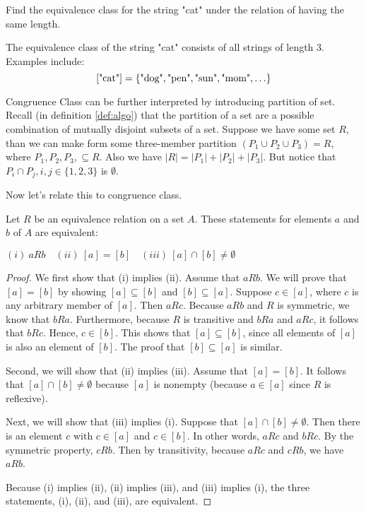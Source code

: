 \begin{example}
	Find the equivalence class for the string "cat" under the relation of having the same length.
\end{example}

\begin{solution}
	The equivalence class of the string "cat" consists of all strings of length 3. Examples include:
	\[ [\text{"cat"}] = \{ \text{"dog"}, \text{"pen"}, \text{"sun"}, \text{"mom"}, \ldots \} \]
\end{solution}
Congruence Class can be further interpreted by introducing partition of set. Recall (in definition \ref{def:algo}) that the partition of a set are a possible combination of mutually disjoint subsets of a set. Suppose we have some set $R$, than we can make form some three-member partition $(P_1\cup P_2\cup P_3) = R$, where $P_1,P_2,P_3,\subseteq R$. Also we have $|R| = |P_1|+|P_2|+|P_3|$. But notice that $P_i\cap P_j, i,j \in\{1,2,3\}$ is $\emptyset$.

Now let's relate this to congruence class.
\begin{theorem}
	Let $R$ be an equivalence relation on a set $A$. These statements for elements $a$ and $b$ of $A$ are equivalent:
	
	$(i)\:aRb\quad(ii)\:[a]=[b]\quad(iii)\:[a]\cap[b]\neq\emptyset$
\end{theorem}
\begin{proof}
	We first show that (i) implies (ii). Assume that \( aRb \). We will prove that \( [a] = [b] \) by showing \( [a] \subseteq [b] \) and \( [b] \subseteq [a] \). Suppose \( c \in [a] \), where $c$ is any arbitrary member of $[a]$. Then \( aRc \). Because \( aRb \) and \( R \) is symmetric, we know that \( bRa \). Furthermore, because \( R \) is transitive and \( bRa \) and \( aRc \), it follows that \( bRc \). Hence, \( c \in [b] \). This shows that \( [a] \subseteq [b] \), since all elements of $[a]$ is also an element of $[b]$. The proof that \( [b] \subseteq [a] \) is similar.
	
	Second, we will show that (ii) implies (iii). Assume that \( [a] = [b] \). It follows that \( [a] \cap [b] \neq \emptyset \) because \( [a] \) is nonempty (because \( a \in [a] \) since \( R \) is reflexive).
	
	Next, we will show that (iii) implies (i). Suppose that \( [a] \cap [b] \neq \emptyset \). Then there is an element \( c \) with \( c \in [a] \) and \( c \in [b] \). In other words, \( aRc \) and \( bRc \). By the symmetric property, \( cRb \). Then by transitivity, because \( aRc \) and \( cRb \), we have \( aRb \).
	
	Because (i) implies (ii), (ii) implies (iii), and (iii) implies (i), the three statements, (i), (ii), and (iii), are equivalent.
\end{proof}

